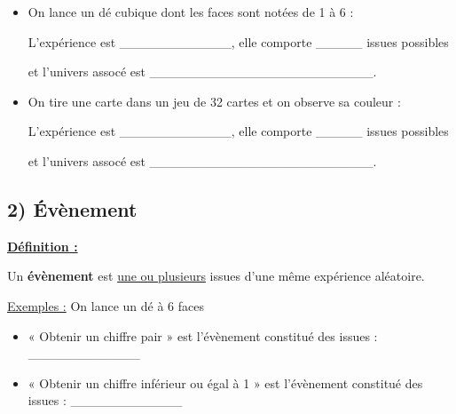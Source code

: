 \documentclass[12pt]{article}
\begin{document}
\begin{itemize}
    \item On lance un dé cubique dont les faces sont notées de 1 à 6 :

    \vspace{20pt}
    L'expérience est \_\_\_\_\_\_\_\_\_\_\_\_, elle comporte \_\_\_\_\_ issues possibles

    \vspace{20pt}
    et l'univers assocé est \_\_\_\_\_\_\_\_\_\_\_\_\_\_\_\_\_\_\_\_\_\_\_\_.

    \vspace{20pt}
    \item On tire une carte dans un jeu de 32 cartes et on observe sa couleur : 
    
    \vspace{20pt}
    L'expérience est \_\_\_\_\_\_\_\_\_\_\_\_, elle comporte \_\_\_\_\_ issues possibles

    \vspace{20pt}
    et l'univers assocé est \_\_\_\_\_\_\_\_\_\_\_\_\_\_\_\_\_\_\_\_\_\_\_\_.
\end{itemize}


\vspace{10pt}
\subsection*{\hspace{1cm} 2) Évènement}

\vspace{5pt}

\begin{mdframed}[
    linewidth=1pt,
    roundcorner=5pt,
    linecolor=ForestGreen,
    innertopmargin=10pt,
    innerbottommargin=10pt
]
{\color{ForestGreen}
\textbf{\underline{Définition :}}}

\vspace{5pt}
Un \textbf{évènement} est \underline{une ou plusieurs} issues d'une même expérience aléatoire.

\end{mdframed}

\vspace{5pt}
\underline{Exemples :} On lance un dé à 6 faces

\begin{itemize}
    \item « Obtenir un chiffre pair » est l'évènement constitué des issues : \_\_\_\_\_\_\_\_\_\_\_\_

    \vspace{20pt}
    \item « Obtenir un chiffre inférieur ou égal à 1 » est l'évènement constitué des issues : \_\_\_\_\_\_\_\_\_\_\_\_
\end{itemize}
\end{document}
